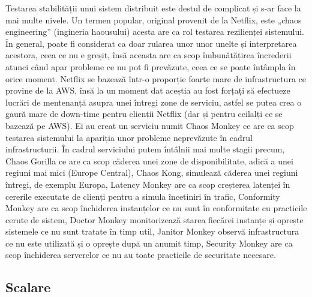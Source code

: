 Testarea stabilității unui sistem distribuit este destul de complicat și s-ar face la mai multe nivele.
Un termen popular, original provenit de la Netflix, este „chaos engineering” (ingineria haousului)
acesta are ca rol testarea rezilienței sistemului. În general, poate fi considerat
ca doar rularea unor unor unelte și interpretarea acestora, ceea ce nu e greșit, însă
aceasta are ca scop îmbunătățirea încrederii atunci când apar probleme ce nu pot fi
prevăzute, ceea ce se poate întâmpla în orice moment. Netflix se bazează într-o proporție
foarte mare de infrastructura ce provine de la AWS, însă la un moment dat aceștia au fost
forțați să efectueze lucrări de mentenanță asupra unei întregi zone de serviciu, astfel
se putea crea o gaură mare de down-time pentru clienții Netflix (dar și pentru ceilalți ce se
bazează pe AWS). Ei au creat un serviciu numit Chaos Monkey ce are ca scop testarea sistemului
la apariția unor probleme neprevăzute în cadrul infrastructurii. În cadrul serviciului
putem întâlnii mai multe stagii precum, Chaos Gorilla ce are ca scop căderea unei zone de disponibilitate,
adică a unei regiuni mai mici (Europe Central), Chaos Kong, simulează căderea unei regiuni întregi,
de exemplu Europa, Latency Monkey are ca scop creșterea latenței în cererile executate
de clienți pentru a simula încetiniri în trafic, Conformity Monkey are ca scop
închiderea instanțelor ce nu sunt în conformitate cu practicile cerute de sistem,
Doctor Monkey monitorizează starea fiecărei instanțe și oprește sistemele ce nu sunt tratate în timp util,
Janitor Monkey observă infrastructura ce nu este utilizată și o oprește după un anumit timp,
Security Monkey are ca scop închiderea serverelor ce nu au toate practicile de securitate
necesare.

\subsection{Scalare}
